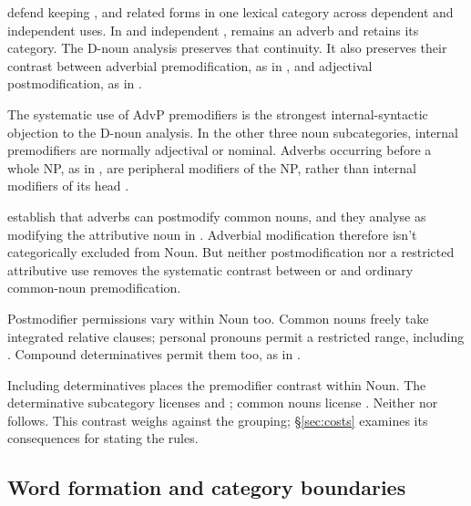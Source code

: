 \documentclass[12pt]{article}
\begin{document}
\textcite[40--42]{payne2010} defend keeping ,  and related forms in one lexical category across dependent and independent uses. In  and independent ,  remains an adverb and  retains its category. The D-noun analysis preserves that continuity. It also preserves their contrast between adverbial premodification, as in , and adjectival postmodification, as in .

The systematic use of AdvP premodifiers is the strongest internal-syntactic objection to the D-noun analysis. In the other three noun subcategories, internal premodifiers are normally adjectival or nominal. Adverbs occurring before a whole NP, as in , are peripheral modifiers of the NP, rather than internal modifiers of its head \citep[430--431]{huddleston2002}.

\textcite[42--47]{payne2010} establish that adverbs can postmodify common nouns, and they analyse  as modifying the attributive noun  in  \citep[p.~75, n.~3]{payne2010}. Adverbial modification therefore isn't categorically excluded from Noun. But neither postmodification nor a restricted attributive use removes the systematic contrast between  or  and ordinary common-noun premodification.

Postmodifier permissions vary within Noun too. Common nouns freely take integrated relative clauses; personal pronouns permit a restricted range, including  \citep[430]{huddleston2002}. Compound determinatives permit them too, as in  \citep[423--424]{huddleston2002}.

Including determinatives places the premodifier contrast within Noun. The determinative subcategory licenses  and ; common nouns license . Neither  nor  follows. This contrast weighs against the grouping; §\ref{sec:costs} examines its consequences for stating the rules.

\subsection{Word formation and category boundaries}\label{sec:word-formation}
\end{document}
